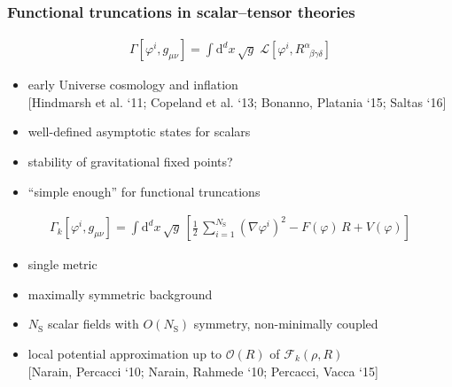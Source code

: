 \documentclass[]{beamer}  %
\newcommand\NS{ N_{\scriptscriptstyle{\mathrm{S}}} }
\begin{document}


\begin{frame}
  \frametitle{Functional truncations in scalar--tensor theories}

  \begin{align*}
      \Gamma[\varphi^i,g_{\mu\nu}]
      = \int \mathrm{d}^dx \, \sqrt{g} \; \mathcal{L}[\varphi^i,R^{\alpha}_{\;\;\beta\gamma\delta}]
  \end{align*}
  \begin{itemize}
    \item early Universe cosmology and inflation\\[1pt]
      [Hindmarsh et al. `11; Copeland et al. `13; Bonanno, Platania `15; Saltas `16]
    \item well-defined asymptotic states for scalars
    \item stability of gravitational fixed points?
    \item ``simple enough'' for functional truncations
  \end{itemize}

  \begin{align*}
    \boxed{
      \Gamma_k [\varphi^i,g_{\mu\nu}] =
      \int \mathrm d^dx \, \sqrt{g} \,
      \left[
          \frac{1}{2} \, \sum_{i=1}^{\NS} \left( \nabla\varphi^i \right)^2
        - F(\varphi) \, R
        + V(\varphi)
      \right]
    }
  \end{align*}

  \begin{itemize}
    \item single metric
    \item maximally symmetric background
    \item $\NS$ scalar fields with $O(\NS)$ symmetry, non-minimally coupled
    \item local potential approximation up to $\mathcal O(R)$ of $\mathcal F_k(\rho, R)$\\[1pt]
  \hfill [Narain, Percacci `10; Narain, Rahmede `10; Percacci, Vacca `15]
  \end{itemize}
\end{frame}


\end{document}
